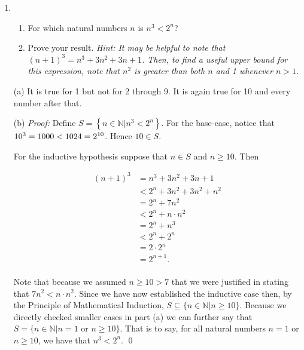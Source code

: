 \documentclass[12pt]{article}
\begin{document}
{\begin{enumerate}
The third line above is justified by the inductive hypothesis, and the last line follows from $\frac{n}{n+1} < 1$, as this is equivalent to $n < n+1$.  We then have that $n+1\in S$ and therefore by the Principle of Mathematical Induction, $S = \mathbb{N}\smallsetminus\{1,2,3\}.$ \qed

(Note: By a direct and tedious calculation we could confirm that indeed ${1,2,3\not\in S}$.)

\item 	\begin{enumerate}
		\item For which natural numbers $n$ is $n^3 < 2^n$?
		\item Prove your result. \emph{Hint: It may be helpful to note that \\$(n+1)^3 = n^3 + 3n^2 + 3n + 1$. Then, to find a useful upper bound for this expression, note that $n^2$ is greater than both $n$ and 1 whenever $n > 1$.}
		\end{enumerate}

(a) It is true for 1 but not for 2 through 9.  It is again true for 10 and every number after that.

(b) {\it Proof:} Define $S=\left\{n\in\mathbb{N}|n^3< 2^n\right\}$.  For the base-case, notice that $\\{10^3 = 1000< 1024 = 2^{10}}$.  Hence $10\in S$.

For the inductive hypothesis suppose that $n\in S$ and $n\geq 10$.  Then

  \begin{align*}
    (n+1)^3 &= n^3 + 3n^2+3n+1\\[.3cm]
    &< 2^n + 3n^2 + 3n^2 + n^2 \\[.3cm]
    &= 2^n + 7n^2\\[.3cm]
    &< 2^n + n\cdot n^2 \\[.3cm]
    &= 2^n + n^3 \\[.3cm]
    &< 2^n + 2^n \\[.3cm]
    &= 2\cdot 2^n \\[.3cm]
    &= 2^{n+1}.\\
  \end{align*}

  Note that because we assumed $n\geq 10 > 7$ that we were justified in stating that $7n^2 < n\cdot n^2$. Since we have now established the inductive case then, by the Principle of Mathematical Induction, $S\subseteq \{n\in\mathbb N| n\geq 10\}$.  Because we directly checked smaller cases in part (a) we can further say that ${S = \{n\in\mathbb N| n=1 \text{ or } n\geq 10\}}$.  That is to say, for all natural numbers $n=1$ or $n\geq 10$, we have that $n^3 < 2^n$. \qed


\end{enumerate}}
\end{document}
